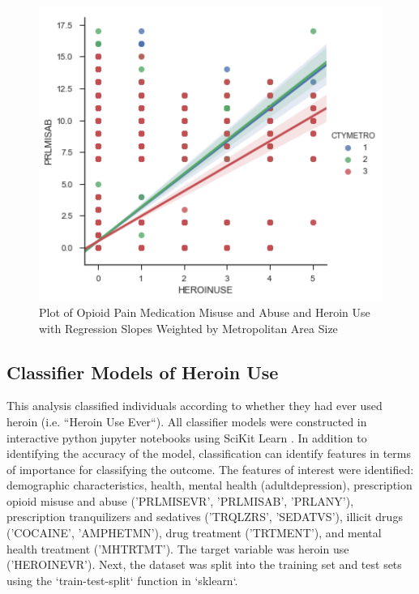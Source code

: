 \documentclass[sigconf]{acmart}
\begin{document}
\begin{figure}[!ht]
  \centering\includegraphics[width=\columnwidth]{images/Figure2.pdf}
  \caption{Plot of Opioid Pain Medication Misuse and Abuse and Heroin Use
  with Regression Slopes Weighted by Metropolitan Area Size}
  \label{f:Figure2}
\end{figure}


\subsection{Classifier Models of Heroin Use \cite{muller17}}

This analysis classified individuals according to whether they had ever used 
heroin (i.e. ``Heroin Use Ever``). All classifier models were constructed in 
interactive python jupyter notebooks using SciKit Learn \cite{classifyH}. 
In addition to identifying the accuracy of the model, classification can 
identify features in terms of importance for classifying the outcome. The 
features of interest were identified: demographic characteristics, health, 
mental health (adultdepression), prescription opioid misuse and abuse 
('PRLMISEVR', 'PRLMISAB', 'PRLANY'), prescription tranquilizers and sedatives 
('TRQLZRS', 'SEDATVS'), illicit drugs ('COCAINE', 'AMPHETMN'), drug treatment 
('TRTMENT'), and mental health treatment ('MHTRTMT'). The target variable was 
heroin use ('HEROINEVR'). Next, the dataset was split into the training set 
and test sets using the `train-test-split` function in `sklearn`.
\end{document}
